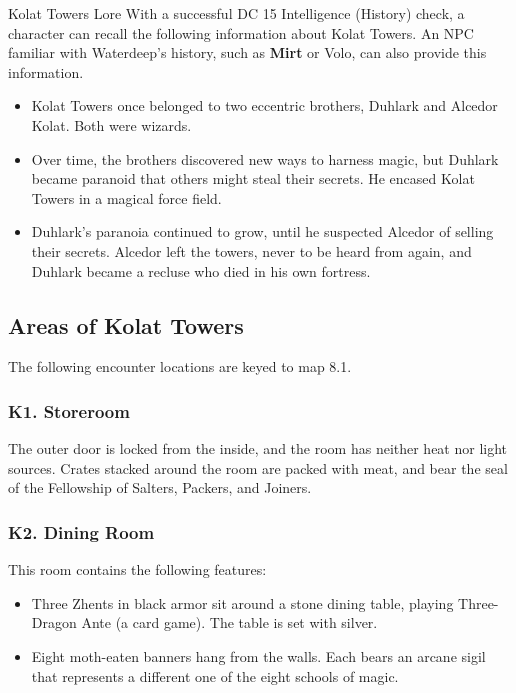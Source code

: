 \documentclass[10pt,a4paper,twoside,twocolumn,openany,nodeprecatedcode]{dndbook}
\begin{document}
\begin{DndComment}{Kolat Towers Lore}
With a successful DC 15 Intelligence (History) check, a character can recall the following information about Kolat Towers. An NPC familiar with Waterdeep's history, such as \textbf{Mirt} or Volo, can also provide this information.
\begin{itemize}

\item Kolat Towers once belonged to two eccentric brothers, Duhlark and Alcedor Kolat. Both were wizards.
\item Over time, the brothers discovered new ways to harness magic, but Duhlark became paranoid that others might steal their secrets. He encased Kolat Towers in a magical force field.
\item Duhlark's paranoia continued to grow, until he suspected Alcedor of selling their secrets. Alcedor left the towers, never to be heard from again, and Duhlark became a recluse who died in his own fortress.
\end{itemize}


\end{DndComment}

\subsection{Areas of Kolat Towers}
The following encounter locations are keyed to map 8.1.
\subsubsection{K1. Storeroom}
The outer door is locked from the inside, and the room has neither heat nor light sources. Crates stacked around the room are packed with meat, and bear the seal of the Fellowship of Salters, Packers, and Joiners.
\subsubsection{K2. Dining Room}
This room contains the following features:
\begin{itemize}

\item Three Zhents in black armor sit around a stone dining table, playing Three-Dragon Ante (a card game). The table is set with silver.
\item Eight moth-eaten banners hang from the walls. Each bears an arcane sigil that represents a different one of the eight schools of magic.
\end{itemize}
\end{document}
